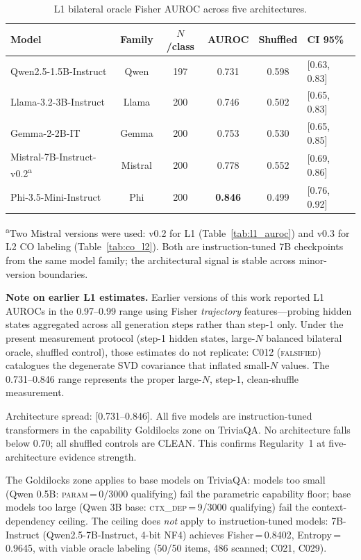 \documentclass[11pt]{article}
\begin{document}
\begin{table}[h!]
\centering
\caption{L1 bilateral oracle Fisher AUROC across five architectures.}
\begin{tabular}{lccccl}
\toprule
Model & Family & $N$/class & AUROC & Shuffled & CI 95\% \\
\midrule
Qwen2.5-1.5B-Instruct & Qwen & 197 & 0.731 & 0.598 & [0.63, 0.83] \\
Llama-3.2-3B-Instruct & Llama & 200 & 0.746 & 0.502 & [0.65, 0.83] \\
Gemma-2-2B-IT & Gemma & 200 & 0.753 & 0.530 & [0.65, 0.85] \\
Mistral-7B-Instruct-v0.2\textsuperscript{a} & Mistral & 200 & 0.778 & 0.552 & [0.69, 0.86] \\
Phi-3.5-Mini-Instruct & Phi & 200 & \textbf{0.846} & 0.499 & [0.76, 0.92] \\
\bottomrule
\end{tabular}
\end{table}

\noindent\small\textsuperscript{a}Two Mistral versions were used: v0.2 for L1 (Table~\ref{tab:l1_auroc}) and v0.3 for L2 CO labeling (Table~\ref{tab:co_l2}). Both are instruction-tuned 7B checkpoints from the same model family; the architectural signal is stable across minor-version boundaries.\par\medskip

\noindent\textbf{Note on earlier L1 estimates.} Earlier versions of this work reported L1 AUROCs in the 0.97--0.99 range using Fisher \emph{trajectory} features---probing hidden states aggregated across all generation steps rather than step-1 only. Under the present measurement protocol (step-1 hidden states, large-$N$ balanced bilateral oracle, shuffled control), those estimates do not replicate: C012 (\textsc{falsified}) catalogues the degenerate SVD covariance that inflated small-$N$ values. The 0.731--0.846 range represents the proper large-$N$, step-1, clean-shuffle measurement.\par\medskip

Architecture spread: [0.731--0.846]. All five models are instruction-tuned transformers
in the capability Goldilocks zone on TriviaQA. No architecture falls below 0.70; all
shuffled controls are CLEAN. This confirms Regularity~1 at five-architecture evidence strength.

The Goldilocks zone applies to base models on TriviaQA: models too small (Qwen 0.5B:
\textsc{param}\,=\,0/3000 qualifying) fail the parametric capability floor; base models
too large (Qwen 3B base: \textsc{ctx\_dep}\,=\,9/3000 qualifying) fail the context-dependency
ceiling. The ceiling does \emph{not} apply to instruction-tuned models: 7B-Instruct
(Qwen2.5-7B-Instruct, 4-bit NF4) achieves Fisher\,=\,0.8402, Entropy\,=\,0.9645,
with viable oracle labeling (50/50 items, 486 scanned; C021, C029).
\end{document}
